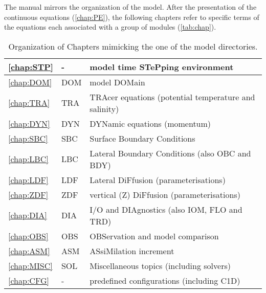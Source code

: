 \documentclass[../tex_main/NEMO_manual]{subfiles}
\begin{document}
The manual mirrors the organization of the model. 
After the presentation of the continuous equations (\autoref{chap:PE}), the following chapters 
refer to specific terms of the equations each associated with a group of modules (\autoref{tab:chap}).


\begin{table}[!t]	
\caption{ \protect\label{tab:chap}   Organization of Chapters mimicking the one of the model directories. }
\begin{center} 	\begin{tabular}{|l|l|l|}	\hline
\autoref{chap:STP}	& -   		        & model time STePping environment \\		\hline
\autoref{chap:DOM}	& DOM		& model DOMain \\		\hline
\autoref{chap:TRA}	& TRA		& TRAcer equations (potential temperature and salinity) \\   \hline
\autoref{chap:DYN}	& DYN		& DYNamic equations (momentum) \\		\hline
\autoref{chap:SBC} 	& SBC		& Surface Boundary Conditions \\			\hline
\autoref{chap:LBC}	& LBC		& Lateral Boundary Conditions (also OBC and BDY)  \\ 		\hline
\autoref{chap:LDF}	& LDF		& Lateral DiFfusion (parameterisations) \\	\hline
\autoref{chap:ZDF}	& ZDF		& vertical (Z) DiFfusion (parameterisations)  \\		\hline
\autoref{chap:DIA}	& DIA		& I/O and DIAgnostics (also IOM, FLO and TRD) \\		\hline
\autoref{chap:OBS}	& OBS		& OBServation and model comparison  \\		\hline
\autoref{chap:ASM}	& ASM		& ASsiMilation increment  \\		\hline
\autoref{chap:MISC}	& SOL		& Miscellaneous  topics (including solvers)  \\       \hline
\autoref{chap:CFG}	&  - 			& predefined configurations (including C1D) \\		\hline
\end{tabular} 	
\end{center}	\end{table}
\end{document}
